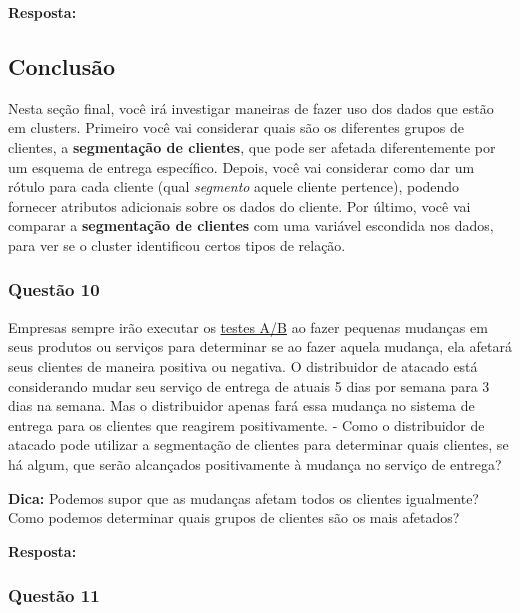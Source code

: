 \documentclass[11pt]{article}
\begin{document}
    \textbf{Resposta:}

    \subsection{Conclusão}\label{conclusuxe3o}

    Nesta seção final, você irá investigar maneiras de fazer uso dos dados
que estão em clusters. Primeiro você vai considerar quais são os
diferentes grupos de clientes, a \textbf{segmentação de clientes}, que
pode ser afetada diferentemente por um esquema de entrega específico.
Depois, você vai considerar como dar um rótulo para cada cliente (qual
\emph{segmento} aquele cliente pertence), podendo fornecer atributos
adicionais sobre os dados do cliente. Por último, você vai comparar a
\textbf{segmentação de clientes} com uma variável escondida nos dados,
para ver se o cluster identificou certos tipos de relação.

    \subsubsection{Questão 10}\label{questuxe3o-10}

Empresas sempre irão executar os
\href{https://en.wikipedia.org/wiki/A/B_testing}{testes A/B} ao fazer
pequenas mudanças em seus produtos ou serviços para determinar se ao
fazer aquela mudança, ela afetará seus clientes de maneira positiva ou
negativa. O distribuidor de atacado está considerando mudar seu serviço
de entrega de atuais 5 dias por semana para 3 dias na semana. Mas o
distribuidor apenas fará essa mudança no sistema de entrega para os
clientes que reagirem positivamente. - Como o distribuidor de atacado
pode utilizar a segmentação de clientes para determinar quais clientes,
se há algum, que serão alcançados positivamente à mudança no serviço de
entrega?

\textbf{Dica:} Podemos supor que as mudanças afetam todos os clientes
igualmente? Como podemos determinar quais grupos de clientes são os mais
afetados?

    \textbf{Resposta:}

    \subsubsection{Questão 11}\label{questuxe3o-11}
\end{document}
